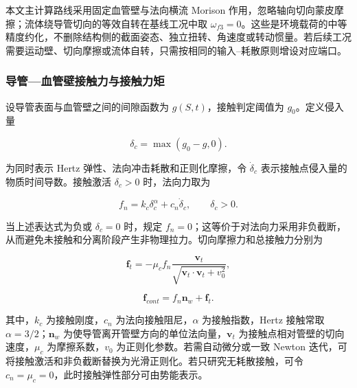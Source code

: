 本文主计算路线采用固定血管壁与法向横流 Morison 作用，忽略轴向切向蒙皮摩擦；流体绕导管切向的等效自转在基线工况中取 \(\omega_{f3} = 0\)。这些是环境载荷的中等精度约化，不删除结构侧的截面姿态、独立扭转、角速度或转动惯量。若后续工况需要运动壁、切向摩擦或流体自转，只需按相同的输入--耗散原则增设对应端口。

\subsubsection{导管---血管壁接触力与接触力矩}\label{sec:rod-1-4-5}

设导管表面与血管壁之间的间隙函数为 \(g(S,t)\)，接触判定阈值为 \(g_{0}\)。定义侵入量

\begin{equation}
\label{eq:rod-1-67}
\delta_{c} = \max\left( g_{0} - g,0 \right).
\end{equation}

为同时表示 Hertz 弹性、法向冲击耗散和正则化摩擦，令 \({\dot{\delta}}_{c}\) 表示接触点侵入量的物质时间导数。接触激活 \(\delta_{c} > 0\) 时，法向力取为\cite{Johnson1985ContactMechanics,HuntCrossley1975Restitution,BrownMcPhee2016Friction}

\begin{equation}
\label{eq:rod-1-68}
f_{n} = k_{c}\delta_{c}^{\alpha} + c_{n}{\dot{\delta}}_{c},\quad\quad\delta_{c} > 0.
\end{equation}

当上述表达式为负或 \(\delta_{c} = 0\) 时，规定 \(f_{n} = 0\)；这等价于对法向力采用非负截断，从而避免未接触和分离阶段产生非物理拉力。切向摩擦力和总接触力分别为

\begin{equation}
\label{eq:rod-1-69}
\mathbf{f}_{t} = - \mu_{c}f_{n}\frac{\mathbf{v}_{t}}{\sqrt{\mathbf{v}_{t} \cdot \mathbf{v}_{t} + v_{0}^{2}}},
\end{equation}

\begin{equation}
\label{eq:rod-1-70}
\mathbf{f}_{cont} = f_{n}\mathbf{n}_{w} + \mathbf{f}_{t}.
\end{equation}

其中，\(k_{c}\) 为接触刚度，\(c_{n}\) 为法向接触阻尼，\(\alpha\) 为接触指数，Hertz 接触常取 \(\alpha = 3/2\)；\(\mathbf{n}_{w}\) 为使导管离开管壁方向的单位法向量，\(\mathbf{v}_{t}\) 为接触点相对管壁的切向速度，\(\mu_{c}\) 为摩擦系数，\(v_{0}\) 为正则化参数。若需自动微分或一致 Newton 迭代，可将接触激活和非负截断替换为光滑正则化。若只研究无耗散接触，可令 \(c_{n} = \mu_{c} = 0\)，此时接触弹性部分可由势能表示。

